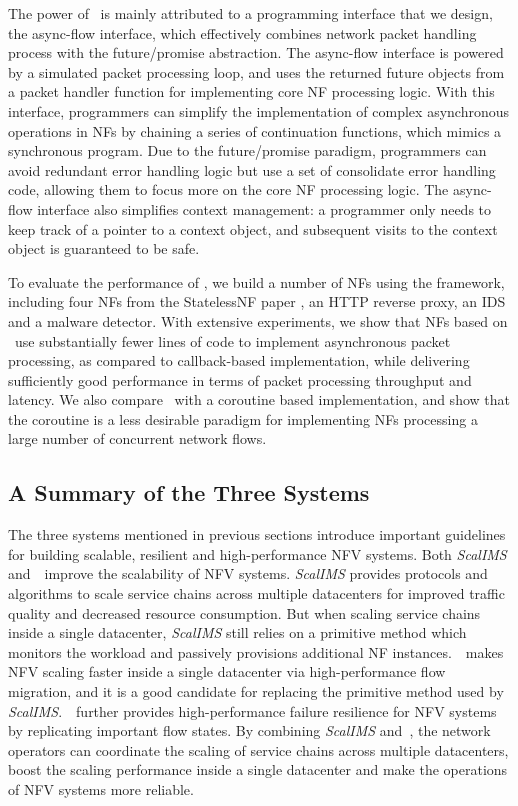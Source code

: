The power of \netstar~is mainly attributed to a programming interface that we design, the async-flow interface, which effectively combines network packet handling process with the future/promise abstraction. The async-flow interface is powered by a simulated packet processing loop, and uses the returned future objects from a packet handler function for implementing core NF processing logic. %
 With this interface, programmers can simplify the implementation of complex asynchronous operations in NFs by chaining a series of continuation functions, which mimics a synchronous program. Due to the future/promise paradigm, programmers can avoid redundant error handling logic but use a set of consolidate error handling code, allowing them to focus more on the core NF processing logic. The async-flow interface also simplifies context management: a programmer only needs to keep track of a pointer to a context object, and subsequent visits to the context object is guaranteed to be safe.

To evaluate the performance of \netstar, we build a number of NFs using the framework, including four NFs from the StatelessNF paper \cite{201545}, an HTTP reverse proxy, an IDS and a malware detector. %
With extensive experiments, we show that NFs based on \netstar~use substantially fewer lines of code to implement asynchronous packet processing, as compared to callback-based implementation, while delivering sufficiently good performance in terms of packet processing throughput and latency. We also compare \netstar~with a coroutine based implementation, and show that the coroutine is a less desirable paradigm for implementing NFs processing a large number of concurrent network flows.

\subsection{A Summary of the Three Systems}

The three systems mentioned in previous sections introduce important guidelines for building scalable, resilient and high-performance NFV systems. Both \textit{ScalIMS} and~\nfactor~improve the scalability of NFV systems. \textit{ScalIMS} provides protocols and algorithms to scale service chains across multiple datacenters for improved traffic quality and decreased resource consumption. But when scaling service chains inside a single datacenter, \textit{ScalIMS} still relies on a primitive method which monitors the workload and passively provisions additional NF instances.~\nfactor~makes NFV scaling faster inside a single datacenter via high-performance flow migration, and it is a good candidate for replacing the primitive method used by \textit{ScalIMS}.~\nfactor~further provides high-performance failure resilience for NFV systems by replicating important flow states. By combining \textit{ScalIMS} and~\nfactor, the network operators can coordinate the scaling of service chains across multiple datacenters, boost the scaling performance inside a single datacenter and make the operations of NFV systems more reliable.

